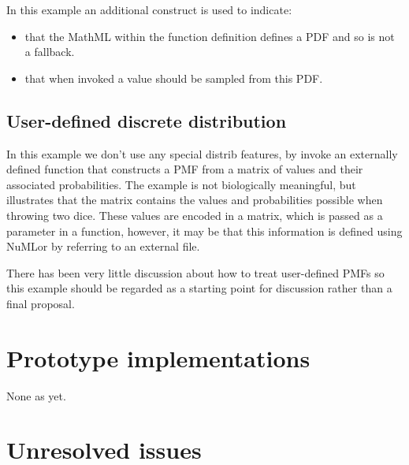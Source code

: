 \documentclass[draftspec]{sbmlpkgspec}
\newcommand{\mathml}{MathML\xspace}
\newcommand{\numl}{NuML\xspace}
\newcommand{\controversial}{\marginpar{\hspace*{34pt}\raisebox{-0.5ex}{\Large?}}}
\begin{document}
In this example an additional construct is used to indicate:
\begin{itemize}
\item that the \mathml within the function definition defines a PDF and so is not a
fallback.
\item that when invoked a value should be sampled from this PDF.
\end{itemize}



\subsection{User-defined discrete distribution}
\label{sec:userDefinedDiscrete}

In this example we don't use any special distrib features, by invoke
an externally defined function that constructs a PMF from a matrix of
values and their associated probabilities. The example is not
biologically meaningful, but illustrates that the matrix contains the
values and probabilities possible when throwing two dice. These values
are encoded in a matrix, which is passed as a parameter in a function,
however, it may be that this information is defined using
\numl\controversial or by referring to an external file.

There has been very little discussion\controversial{} about how to treat user-defined
PMFs so this example should be regarded as a starting point for
discussion rather than a final proposal.


\section{Prototype implementations}

None as yet.

\section{Unresolved issues}
\label{sec:unresolved}
\end{document}
